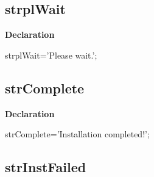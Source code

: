 \documentclass{report}
\newif\ifpdf
\begin{document}
\subsection*{strplWait}
\fi
\label{trstrings-strplWait}
\begin{list}{}{
\setlength{\itemindent}{0cm}
\setlength{\listparindent}{0cm}
\setlength{\leftmargin}{\evensidemargin}
\addtolength{\leftmargin}{\tmplength}
\settowidth{\labelsep}{X}
\addtolength{\leftmargin}{\labelsep}
\setlength{\labelwidth}{\tmplength}
}
\item[\textbf{Declaration}\hfill]
\ifpdf
\begin{flushleft}
\fi
\begin{ttfamily}
strplWait='Please wait.';\end{ttfamily}

\ifpdf
\end{flushleft}
\fi

\end{list}
\ifpdf
\subsection*{\large{\textbf{strComplete}}\normalsize\hspace{1ex}\hrulefill}
\else
\subsection*{strComplete}
\fi
\label{trstrings-strComplete}
\begin{list}{}{
\setlength{\itemindent}{0cm}
\setlength{\listparindent}{0cm}
\setlength{\leftmargin}{\evensidemargin}
\addtolength{\leftmargin}{\tmplength}
\settowidth{\labelsep}{X}
\addtolength{\leftmargin}{\labelsep}
\setlength{\labelwidth}{\tmplength}
}
\item[\textbf{Declaration}\hfill]
\ifpdf
\begin{flushleft}
\fi
\begin{ttfamily}
strComplete='Installation completed!';\end{ttfamily}

\ifpdf
\end{flushleft}
\fi

\end{list}
\ifpdf
\subsection*{\large{\textbf{strInstFailed}}\normalsize\hspace{1ex}\hrulefill}
\else
\end{document}
